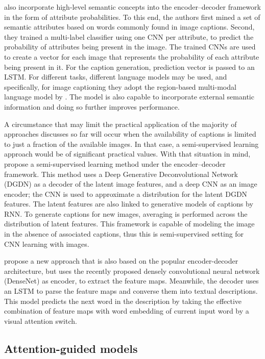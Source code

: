 \citet{Wu2016} also incorporate high-level semantic concepts into the encoder–decoder framework in the form of attribute probabilities. To this end, the authors first mined a set of semantic attributes based on words commonly found in image captions. Second, they trained a multi-label classifier using one CNN per attribute, to predict the probability of attributes being present in the image. The trained CNNs are used to create a vector for each image that represents the probability of each attribute being present in it. For the caption generation, prediction vector is passed to an LSTM. For different tasks, different language models may be used, and specifically, for image captioning they adopt the region-based multi-modal language model by \citet{Vinyals2015}. The model is also capable to incorporate external semantic information and doing so further improves performance.

A circumstance that may limit the practical application of the majority of approaches discusses so far will occur when the availability of captions is limited to just a fraction of the available images. In that case, a semi-supervised learning approach would be of significant practical values. With that situation in mind, \citet{Pu2016_VAE} propose a semi-supervised learning method under the encoder–decoder framework. This method uses a Deep Generative Deconvolutional Network (DGDN) \citep{Pu2016_DGDN} as a decoder of the latent image features, and a deep CNN as an image encoder; the CNN is used to approximate a distribution for the latent DGDN features. The latent features are also linked to generative models of captions by RNN. To generate captions for new images, averaging is performed across the distribution of latent features. This framework is capable of modeling the image in the absence of associated captions, thus this is semi-supervised setting for CNN learning with images. 

\citet{Hao2018} propose a new approach that is also based on the popular encoder-decoder architecture, but uses the recently proposed densely convolutional neural network (DenseNet) as encoder, to extract the feature maps. Meanwhile, the decoder uses an LSTM to parse the feature maps and converse them into textual descriptions. This model predicts the next word in the description by taking the effective combination of feature maps with word embedding of current input word by a visual attention switch.

\subsection{Attention-guided models}\label{sec:attention-guided_models}

